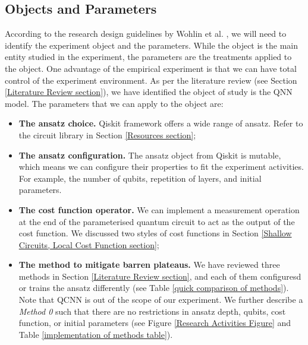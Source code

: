 \subsection{Objects and Parameters}\label{Objects section}
According to the research design guidelines by Wohlin et al. \cite{wohlinExperimentationSoftwareEngineering2012}, we will need to identify the experiment object and the parameters.
While the object is the main entity studied in the experiment, the parameters are the treatments applied to the object.
One advantage of the empirical experiment is that we can have total control of the experiment environment.
As per the literature review (see Section \ref{Literature Review section}), we have identified the object of study is the QNN model.
The parameters that we can apply to the object are:
\begin{itemize}
    \item \textbf{The ansatz choice.} Qiskit framework offers a wide range of ansatz. Refer to the circuit library in Section \ref{Resources section};
    \item \textbf{The ansatz configuration.} The ansatz object from Qiskit is mutable, which means we can configure their properties to fit the experiment activities. For example, the number of qubits, repetition of layers, and initial parameters.
    \item \textbf{The cost function operator.} We can implement a measurement operation at the end of the parameterised quantum circuit to act as the output of the cost function. We discussed two styles of cost functions in Section \ref{Shallow Circuits, Local Cost Function section};
    \item \textbf{The method to mitigate barren plateaus.} We have reviewed three methods in Section \ref{Literature Review section}, and each of them configuresd or trains the ansatz differently (see Table \ref{quick comparison of methods}). Note that QCNN is out of the scope of our experiment. We further describe a \emph{Method 0} such that there are no restrictions in ansatz depth, qubits, cost function, or initial parameters (see Figure \ref{Research Activities Figure} and Table \ref{implementation of methods table}).
\end{itemize}